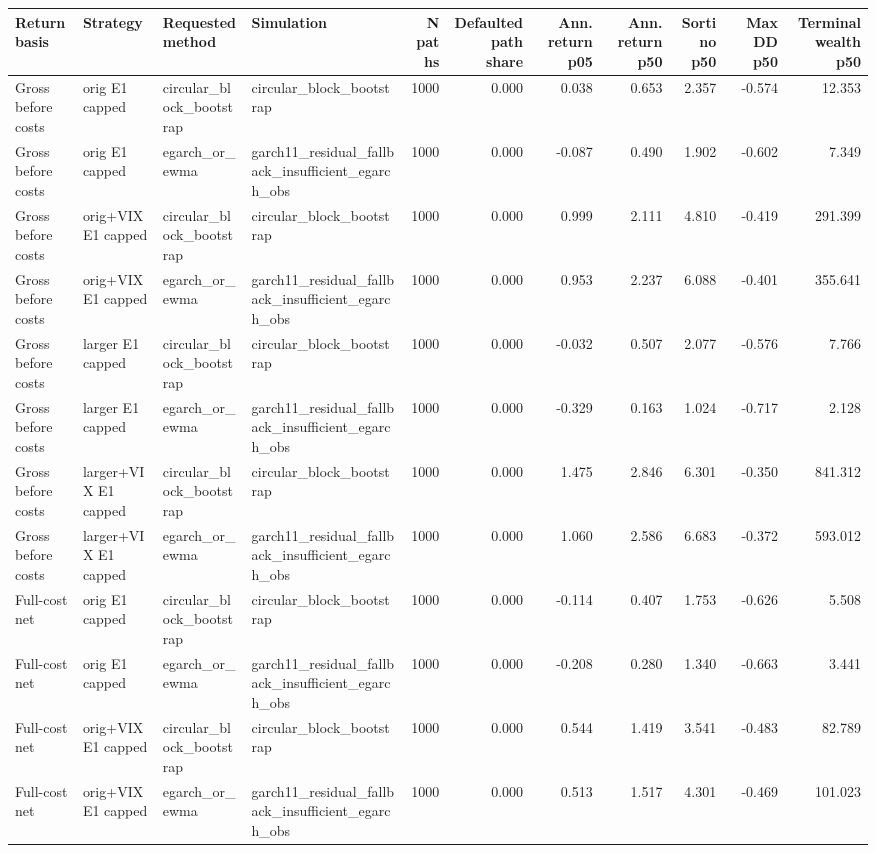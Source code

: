 \begin{tabular}{llllrrrrrrr}
\toprule
Return basis & Strategy & Requested method & Simulation & N paths & Defaulted path share & Ann. return p05 & Ann. return p50 & Sortino p50 & Max DD p50 & Terminal wealth p50 \\
\midrule
Gross before costs & orig E1 capped & circular\_block\_bootstrap & circular\_block\_bootstrap & 1000 & 0.000 & 0.038 & 0.653 & 2.357 & -0.574 & 12.353 \\
Gross before costs & orig E1 capped & egarch\_or\_ewma & garch11\_residual\_fallback\_insufficient\_egarch\_obs & 1000 & 0.000 & -0.087 & 0.490 & 1.902 & -0.602 & 7.349 \\
Gross before costs & orig+VIX E1 capped & circular\_block\_bootstrap & circular\_block\_bootstrap & 1000 & 0.000 & 0.999 & 2.111 & 4.810 & -0.419 & 291.399 \\
Gross before costs & orig+VIX E1 capped & egarch\_or\_ewma & garch11\_residual\_fallback\_insufficient\_egarch\_obs & 1000 & 0.000 & 0.953 & 2.237 & 6.088 & -0.401 & 355.641 \\
Gross before costs & larger E1 capped & circular\_block\_bootstrap & circular\_block\_bootstrap & 1000 & 0.000 & -0.032 & 0.507 & 2.077 & -0.576 & 7.766 \\
Gross before costs & larger E1 capped & egarch\_or\_ewma & garch11\_residual\_fallback\_insufficient\_egarch\_obs & 1000 & 0.000 & -0.329 & 0.163 & 1.024 & -0.717 & 2.128 \\
Gross before costs & larger+VIX E1 capped & circular\_block\_bootstrap & circular\_block\_bootstrap & 1000 & 0.000 & 1.475 & 2.846 & 6.301 & -0.350 & 841.312 \\
Gross before costs & larger+VIX E1 capped & egarch\_or\_ewma & garch11\_residual\_fallback\_insufficient\_egarch\_obs & 1000 & 0.000 & 1.060 & 2.586 & 6.683 & -0.372 & 593.012 \\
Full-cost net & orig E1 capped & circular\_block\_bootstrap & circular\_block\_bootstrap & 1000 & 0.000 & -0.114 & 0.407 & 1.753 & -0.626 & 5.508 \\
Full-cost net & orig E1 capped & egarch\_or\_ewma & garch11\_residual\_fallback\_insufficient\_egarch\_obs & 1000 & 0.000 & -0.208 & 0.280 & 1.340 & -0.663 & 3.441 \\
Full-cost net & orig+VIX E1 capped & circular\_block\_bootstrap & circular\_block\_bootstrap & 1000 & 0.000 & 0.544 & 1.419 & 3.541 & -0.483 & 82.789 \\
Full-cost net & orig+VIX E1 capped & egarch\_or\_ewma & garch11\_residual\_fallback\_insufficient\_egarch\_obs & 1000 & 0.000 & 0.513 & 1.517 & 4.301 & -0.469 & 101.023 \\

\end{tabular}
